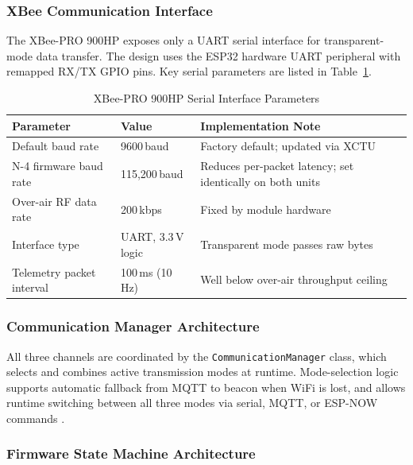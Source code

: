 \subsubsection{XBee Communication Interface}

The XBee-PRO 900HP exposes only a UART serial interface for transparent-mode
data transfer. The design uses the ESP32 hardware UART peripheral with remapped
RX/TX GPIO pins. Key serial parameters are listed in Table~\ref{tab:xbee_serial_params}.

\begin{table}[!htbp]
  \centering
  \caption{XBee-PRO 900HP Serial Interface Parameters}
  \label{tab:xbee_serial_params}
  \small
  \renewcommand{\arraystretch}{1.2}
  \begin{tabular}{@{}p{4cm}|p{3cm}|p{6cm}@{}}
    \toprule
    \rowcolor{gray!22}\textbf{Parameter} & \textbf{Value} & \textbf{Implementation Note} \\ \midrule
    Default baud rate & 9600\,baud & Factory default; updated via XCTU \\
    N-4 firmware baud rate & 115{,}200\,baud & Reduces per-packet latency; set identically on both units \\
    Over-air RF data rate & 200\,kbps & Fixed by module hardware \\
    Interface type & UART, 3.3\,V logic & Transparent mode passes raw bytes \\
    Telemetry packet interval & 100\,ms (10\,Hz) & Well below over-air throughput ceiling \\ \bottomrule
  \end{tabular}
\end{table}

\subsubsection{Communication Manager Architecture}

All three channels are coordinated by the \texttt{CommunicationManager} class,
which selects and combines active transmission modes at runtime. Mode-selection
logic supports automatic fallback from MQTT to beacon when WiFi is lost, and
allows runtime switching between all three modes via serial, MQTT, or ESP-NOW
commands \cite{n4_comm_architecture}.

\subsubsection{Firmware State Machine Architecture}

